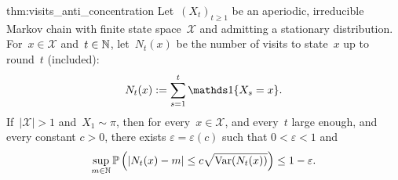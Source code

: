 \documentclass{article}
\begin{document}
\begin{reptheorem}{thm:visits_anti_concentration}
    Let~$(X_t)_{t \geq 1}$ be an aperiodic, irreducible Markov chain with finite state space~$\mathcal{X}$ and admitting a stationary distribution. For~$x \in \mathcal{X}$ and~$t \in \operatorname{\mathbb{N}}$, let~$N_t(x)$ be the number of visits to state~$x$ up to round~$t$ (included):
    \begin{equation*}
        N_t(x) := \sum_{s=1}^t \bbOne \{ X_s = x \}.
    \end{equation*}
    If~$|\mathcal{X}|>1$ and~$X_1 \sim \pi$, then for every~$x \in \mathcal{X}$, and every~$t$ large enough, and every constant $c>0$, there exists $\varepsilon = \varepsilon(c)$ such that $0<\varepsilon <1$ and
    \begin{equation*}
       \sup_{m \in \mathbb{N}} \operatorname{\mathbb{P}} \left( |N_t(x) - m| \leq c\sqrt{\mathrm{Var}(N_t(x))} \right)\leq 1-\varepsilon.
    \end{equation*}
\end{reptheorem}
\end{document}
